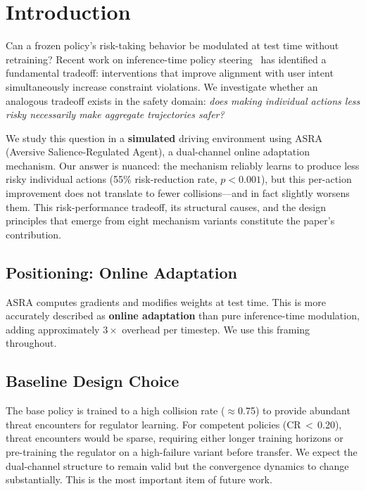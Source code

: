 \documentclass[runningheads]{llncs}
\begin{document}
\FloatBarrier
\section{Introduction}
\label{sec:intro}

Can a frozen policy's risk-taking behavior be modulated at test time without retraining? Recent work on inference-time policy steering~\cite{itps2025} has identified a fundamental tradeoff: interventions that improve alignment with user intent simultaneously increase constraint violations. We investigate whether an analogous tradeoff exists in the safety domain: \emph{does making individual actions less risky necessarily make aggregate trajectories safer?}

We study this question in a \textbf{simulated} driving environment using ASRA (Aversive Salience-Regulated Agent), a dual-channel online adaptation mechanism. Our answer is nuanced: the mechanism reliably learns to produce less risky individual actions (55\% risk-reduction rate, $p{<}0.001$), but this per-action improvement does not translate to fewer collisions---and in fact slightly worsens them. This risk-performance tradeoff, its structural causes, and the design principles that emerge from eight mechanism variants constitute the paper's contribution.

\subsection{Positioning: Online Adaptation}

ASRA computes gradients and modifies weights at test time. This is more accurately described as \textbf{online adaptation} than pure inference-time modulation, adding approximately $3\times$ overhead per timestep. We use this framing throughout.

\subsection{Baseline Design Choice}

The base policy is trained to a high collision rate ($\approx$0.75) to provide abundant threat encounters for regulator learning. For competent policies (CR\,$<$\,0.20), threat encounters would be sparse, requiring either longer training horizons or pre-training the regulator on a high-failure variant before transfer. We expect the dual-channel structure to remain valid but the convergence dynamics to change substantially. This is the most important item of future work.
\end{document}

